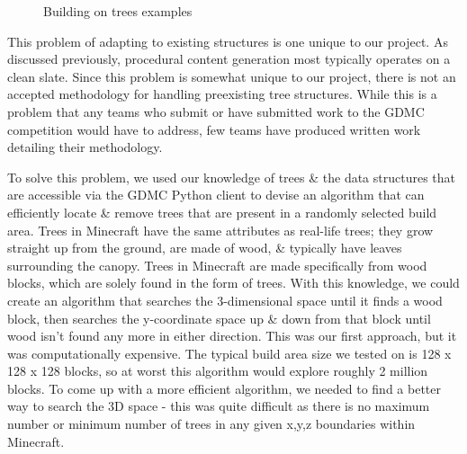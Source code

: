 \documentclass[11pt, oneside]{article}
\begin{document}
\begin{normalsize}
\begin{figure}[H]%
    \centering
    \qquad
    \caption{Building on trees examples}%
    \label{fig:tree}%
\end{figure}

This problem of adapting to existing structures is one unique to our project. As discussed previously, procedural content generation most typically operates on a clean slate. Since this problem is somewhat unique to our project, there is not an accepted methodology for handling preexisting tree structures. While this is a problem that any teams who submit or have submitted work to the GDMC competition would have to address, few teams have produced written work detailing their methodology.

To solve this problem, we used our knowledge of trees \& the data structures that are accessible via the GDMC Python client to devise an algorithm that can efficiently locate \& remove trees that are present in a randomly selected build area. Trees in Minecraft have the same attributes as real-life trees; they grow straight up from the ground, are made of wood, \& typically have leaves surrounding the canopy. Trees in Minecraft are made specifically from wood blocks, which are solely found in the form of trees. With this knowledge, we could create an algorithm that searches the 3-dimensional space until it finds a wood block, then searches the y-coordinate space up \& down from that block until wood isn't found any more in either direction. This was our first approach, but it was computationally expensive. The typical build area size we tested on is 128 x 128 x 128 blocks, so at worst this algorithm would explore roughly 2 million blocks. To come up with a more efficient algorithm, we needed to find a better way to search the 3D space -  this was quite difficult as there is no maximum number or minimum number of trees in any given x,y,z boundaries within Minecraft. 


\end{normalsize}
\end{document}
